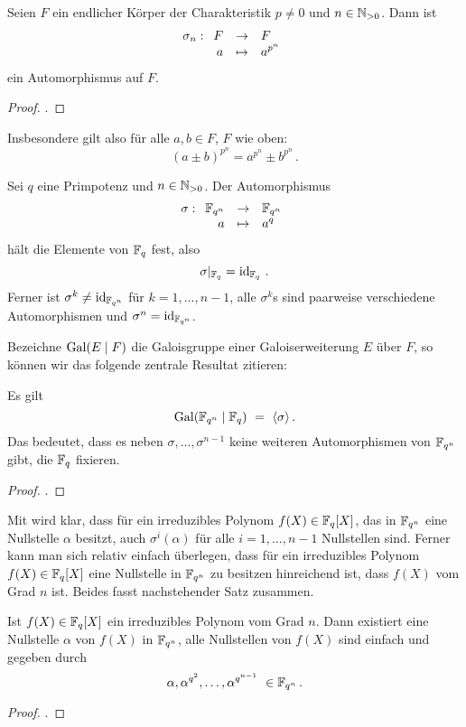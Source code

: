 \begin{satz}
  \label{satz:frob_auto}
  Seien $F$ ein endlicher Körper der Charakteristik $p\neq 0$ und 
  $n\in \mathbb{N}_{>0}$. Dann ist
  \[ \sigma_n: \funcdef{F &\to& F\\
    a &\mapsto& a^{p^n}}\]
  ein Automorphismus auf $F$.
\end{satz}
\begin{proof}
  \autocite[Corollary 3.18]{wan2003lectures}.
\end{proof}

\begin{bemerkung}
  Insbesondere gilt also für alle $a,b\in F$, $F$ wie oben:
  \[ (a\pm b)^{p^n} = a^{p^n} \pm b^{p^n}\,.\]
\end{bemerkung}

\begin{satz}
  \label{satz:frob_auto}
  Sei $q$ eine Primpotenz und $n\in \mathbb{N}_{>0}$. Der Automorphismus
  \[ \sigma: \funcdef{\F_{q^n} &\to& \F_{q^n}\\
    a &\mapsto& a^q}\]
  hält die Elemente von $\mathbb{F}_q$ fest, also 
  \[ \sigma |_{\mathbb{F}_q} = \operatorname{id}_{\mathbb{F}_q}\,.\]
  Ferner ist $\sigma^k \neq \operatorname{id}_{\mathbb{F}_{q^n}}$ für $k=1,\ldots,n-1$, alle
  $\sigma^k$s sind paarweise verschiedene Automorphismen und 
  $\sigma^n = \operatorname{id}_{\mathbb{F}_{q^n}}$.
\end{satz}


Bezeichne $\operatorname{Gal}(E \mid F)$ die Galoisgruppe einer Galoiserweiterung $E$ über
$F$, so können wir das folgende zentrale Resultat zitieren:

\begin{satz}
  \label{satz:frob_sind_alle_autos}
  Es gilt
  \[ \operatorname{Gal}(\mathbb{F}_{q^n}\mid \mathbb{F}_q) \ =\  \langle \sigma\rangle\,.\]
  Das bedeutet, dass es neben $\sigma,\ldots,\sigma^{n-1}$ keine weiteren
  Automorphismen von $\mathbb{F}_{q^n}$ gibt, die $\mathbb{F}_q$ fixieren.
\end{satz}
\begin{proof}
  \autocite[Theorem 7.3]{wan2003lectures}.
\end{proof}


Mit  wird klar, dass für ein
irreduzibles Polynom $f(X) \in \mathbb{F}_q[X]$, das in $\mathbb{F}_{q^n}$ eine Nullstelle 
$\alpha$ besitzt, auch $\sigma^i(\alpha)$ für alle $i=1,\ldots,n-1$
Nullstellen sind. 
Ferner kann man sich relativ einfach überlegen, dass
für ein irreduzibles Polynom $f(X)\in \mathbb{F}_q[X]$ eine Nullstelle 
in $\mathbb{F}_{q^n}$ zu besitzen hinreichend ist, dass $f(X)$ vom Grad $n$ ist. 
Beides fasst nachstehender Satz zusammen.

\begin{satz}
  \label{satz:nst_irred_polys}
  Ist $f(X) \in \mathbb{F}_q[X]$ ein irreduzibles Polynom vom Grad $n$. Dann 
  existiert eine Nullstelle $\alpha$ von $f(X)$ in $\mathbb{F}_{q^n}$, alle 
  Nullstellen von $f(X)$ sind einfach und gegeben durch
  \[ \alpha, \alpha^{q^2}, \ldots, \alpha^{q^{n-1}}\ \in \mathbb{F}_{q^n}\,.\]
\end{satz}
\begin{proof}
  \autocite[Theorem 2.14]{lidl1997finite}.
\end{proof}
